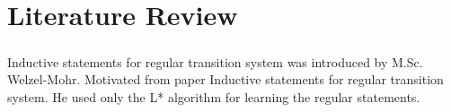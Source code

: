 \chapter{Literature Review}\label{chapter:literature_review}

\paragraph{}
Inductive statements for regular transition system was introduced by M.Sc. Welzel-Mohr.
Motivated from paper Inductive statements for regular transition system.
He used only the L* algorithm for learning the regular statements.
